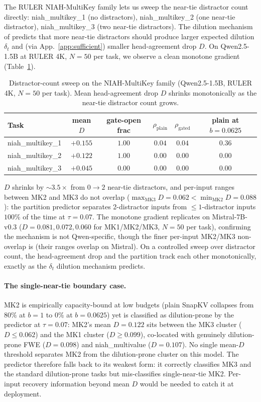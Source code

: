 \documentclass{article}
\begin{document}
The RULER NIAH-MultiKey family lets us sweep the near-tie distractor count
directly: niah\_multikey\_1 (no distractors), niah\_multikey\_2 (one
near-tie distractor), niah\_multikey\_3 (two near-tie distractors).
The dilution mechanism of \citet{arxiv260509649} predicts that more
near-tie distractors should produce
larger expected dilution $\delta_t$ and (via App.~\ref{app:sufficient})
smaller head-agreement drop $D$. On Qwen2.5-1.5B at RULER 4K, $N = 50$
per task, we observe a clean monotone gradient (Table~\ref{tab:distractor}).

\begin{table}[t]
\centering
\caption{Distractor-count sweep on the NIAH-MultiKey family
(Qwen2.5-1.5B, RULER 4K, $N = 50$ per task). Mean head-agreement drop
$D$ shrinks monotonically as the near-tie distractor count grows.}
\label{tab:distractor}
\begin{tabular}{lccccc}
\toprule
Task & mean $D$ & gate-open frac & $\rho_{\mathrm{plain}}$ & $\rho_{\mathrm{gated}}$ & plain at $b{=}0.0625$ \\
\midrule
niah\_multikey\_1 & $+0.155$ & $1.00$ & $0.04$ & $0.04$ & $0.36$ \\
niah\_multikey\_2 & $+0.122$ & $1.00$ & $0.00$ & $0.00$ & $0.00$ \\
niah\_multikey\_3 & $+0.045$ & $0.00$ & $0.00$ & $0.00$ & $0.00$ \\
\bottomrule
\end{tabular}
\end{table}

$D$ shrinks by $\sim 3.5\times$ from $0 \to 2$ near-tie distractors,
and per-input ranges between MK2 and MK3 do not overlap
($\max_{\text{MK3}} D = 0.062 < \min_{\text{MK2}} D = 0.088$): the
partition predictor separates 2-distractor inputs from
$\leq 1$-distractor inputs $100\%$ of the time at $\tau = 0.07$. The
monotone gradient replicates on Mistral-7B-v0.3 ($D = 0.081, 0.072,
0.060$ for MK1/MK2/MK3, $N = 50$ per task), confirming the mechanism
is not Qwen-specific, though the finer per-input MK2/MK3 non-overlap is
(their ranges overlap on Mistral). On a
controlled sweep over distractor count, the head-agreement drop and
the partition track each other monotonically, exactly as the
$\delta_t$ dilution mechanism predicts.

\paragraph{The single-near-tie boundary case.} MK2 is empirically
capacity-bound at low budgets (plain SnapKV collapses from $80\%$ at
$b{=}1$ to $0\%$ at $b{=}0.0625$) yet is classified as dilution-prone
by the predictor at $\tau = 0.07$: MK2's mean $D = 0.122$ sits between
the MK3 cluster ($D \leq 0.062$) and the MK1 cluster ($D \geq 0.099$),
co-located with genuinely dilution-prone FWE ($D = 0.098$) and
niah\_multivalue ($D = 0.107$). No single mean-$D$ threshold separates
MK2 from the dilution-prone cluster on this model. The predictor
therefore falls back to its weakest form: it correctly classifies MK3
and the standard dilution-prone tasks but mis-classifies single-near-tie
MK2. Per-input recovery information beyond mean $D$ would be needed to
catch it at deployment.
\end{document}
